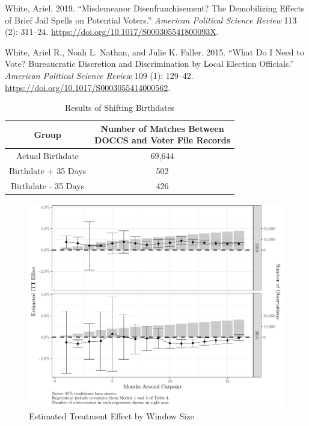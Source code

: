 \documentclass[
  12pt,
]{article}
\newlength{\cslhangindent}
\newenvironment{cslreferences}%
  {\setlength{\parindent}{0pt}%
  \everypar{\setlength{\hangindent}{\cslhangindent}}\ignorespaces}%
  {\par}
\begin{document}
\begin{cslreferences}
\leavevmode\hypertarget{ref-White2019}{}%
White, Ariel. 2019. ``Misdemeanor Disenfranchisement? The Demobilizing Effects of Brief Jail Spells on Potential Voters.'' \emph{American Political Science Review} 113 (2): 311--24. \url{https://doi.org/10.1017/S000305541800093X}.

\leavevmode\hypertarget{ref-White2015}{}%
White, Ariel R., Noah L. Nathan, and Julie K. Faller. 2015. ``What Do I Need to Vote? Bureaucratic Discretion and Discrimination by Local Election Officials.'' \emph{American Political Science Review} 109 (1): 129--42. \url{https://doi.org/10.1017/S0003055414000562}.
\end{cslreferences}

\newpage

\begin{singlespace}
\begin{table}[H]

\caption{\label{tab:shift-dobs-chunk}\label{tab:change-dobs} Results of Shifting Birthdates}
\centering
\begin{tabular}[t]{cc}
\toprule
Group & \makecell[l]{Number of Matches Between\\DOCCS and Voter File Records}\\
\midrule
Actual Birthdate & 69,644\\
Birthdate + 35 Days & 502\\
Birthdate - 35 Days & 426\\
\bottomrule
\end{tabular}
\end{table}










\end{singlespace}

\newpage
\begin{figure}[H]

{\centering \includegraphics{rewrite_files/figure-latex/sensitivity-1} 

}

\caption{\label{fig:sens}Estimated Treatment Effect by Window Size}\label{fig:sensitivity}
\end{figure}
\end{document}
